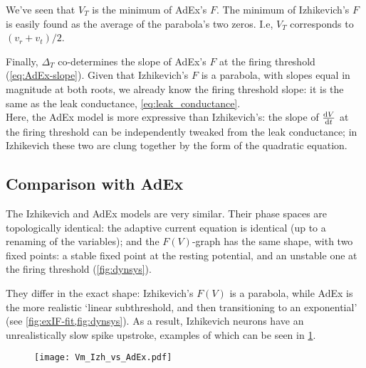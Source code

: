 We've seen that $V_T$ is the minimum of AdEx's $F$.
The minimum of Izhikevich's $F$ is easily found as the average of the parabola's two zeros. I.e, $V_T$ corresponds to $(v_r + v_t) / 2$.

Finally, $Δ_T$ co-determines the slope of AdEx's $F$ at the firing threshold (\cref{eq:AdEx-slope}). Given that Izhikevich's $F$ is a parabola, with slopes equal in magnitude at both roots, we already know the firing threshold slope: it is the same as the leak conductance, \cref{eq:leak_conductance}.\\
Here, the AdEx model is more expressive than Izhikevich's: the slope of $\frac{\mathrm{d}V}{\mathrm{d}t}$ at the firing threshold can be independently tweaked from the leak conductance; in Izhikevich these two are clung together by the form of the quadratic equation.

\FloatBarrier
\subsection{Comparison with AdEx}

The Izhikevich and AdEx models are very similar. Their phase spaces are topologically identical:
the adaptive current equation is identical (up to a renaming of the variables); and the $F(V)$-graph has the same shape, with two fixed points: a stable fixed point at the resting potential, and an unstable one at the firing threshold (\cref{fig:dynsys}).

They differ in the exact shape: Izhikevich's $F(V)$ is a parabola, while AdEx is the more realistic `linear subthreshold, and then transitioning to an exponential' (see \cref{fig:exIF-fit,fig:dynsys}).
As a result, Izhikevich neurons have an unrealistically slow spike upstroke, examples of which can be seen in \cref{fig:Vm_Izh_vs_AdEx}.

\begin{figure}
    \hspace*{10em}
    \texttt{[image: Vm\_Izh\_vs\_AdEx.pdf]}
    \label{fig:Vm_Izh_vs_AdEx}
\end{figure}

